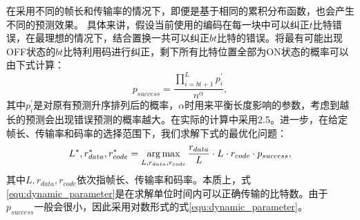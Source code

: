 在采用不同的帧长和传输率的情况下，即便是基于相同的累积分布函数，也会产生不同的预测效果。
具体来讲，假设当前使用的编码在每一块中可以纠正$t$比特错误，在最理想的情况下，结合置换一共可以纠正$bt$比特的错误。将最有可能出现OFF状态的$bt$比特利用码进行纠正，剩下所有比特位置全部为ON状态的概率可以由下式计算：
\begin{equation}
p_{success} = \frac{\prod_{i = bt+1}^{L} p_i^{'}}{n^\alpha},
\end{equation}
其中$p_i^{'}$是对原有预测升序排列后的概率，$\alpha$时用来平衡长度影响的参数，考虑到越长的预测会出现错误预测的概率越大。在实际的计算中采用2.5。进一步，在给定帧长、传输率和码率的选择范围下，我们求解下式的最优化问题：
\begin{equation}
\label{equ:dynamic_parameter}
L^\ast, r_{data}^\ast, r_{code}^\ast = \operatorname*{arg\,max}_{L, r_{data}, r_{code}} \frac{r_{data}}{L}\cdot L\cdot r_{code} \cdot p_{success},
\end{equation}
其中$L,r_{data},r_{code}$依次指帧长、传输率和码率。本质上，式\ref{equ:dynamic_parameter}是在求解单位时间内可以正确传输的比特数。由于$p_{success}$一般会很小，因此采用对数形式的式\ref{equ:dynamic_parameter}。